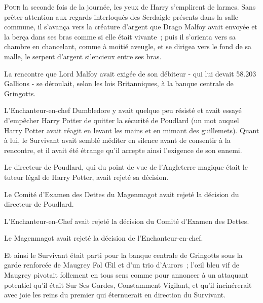 
\lettrine{P}{our} la seconde fois de la journée, les yeux de Harry s'emplirent de larmes. Sans prêter attention aux regards interloqués des Serdaigle présents dans la salle commune, il s'avança vers la créature d'argent que Drago Malfoy avait envoyée et la berça dans ses bras comme si elle était vivante~; puis il s'orienta vers sa chambre en chancelant, comme à moitié aveugle, et se dirigea vers le fond de sa malle, le serpent d'argent silencieux entre ses bras.


La rencontre que Lord Malfoy avait exigée de son débiteur - qui lui devait 58.203 Gallions - se déroulait, selon les lois Britanniques, à la banque centrale de Gringotts.

L'Enchanteur-en-chef Dumbledore y avait quelque peu résisté et avait essayé d'empêcher Harry Potter de quitter la sécurité de Poudlard (un mot auquel Harry Potter avait réagit en levant les mains et en mimant des guillemets). Quant à lui, le Survivant avait semblé méditer en silence avant de consentir à la rencontre, et il avait été étrange qu'il accepte ainsi l'exigence de son ennemi.

Le directeur de Poudlard, qui du point de vue de l'Angleterre magique était le tuteur légal de Harry Potter, avait rejeté sa décision.

Le Comité d'Examen des Dettes du Magenmagot avait rejeté la décision du directeur de Poudlard.

L'Enchanteur-en-Chef avait rejeté la décision du Comité d'Examen des Dettes.

Le Magenmagot avait rejeté la décision de l'Enchanteur-en-chef.

Et ainsi le Survivant était parti pour la banque centrale de Gringotts sous la garde renforcée de Maugrey Fol Œil et d'un trio d'Aurors~; l'œil bleu vif de Maugrey pivotait follement en tous sens comme pour annoncer à un attaquant potentiel qu'il était Sur Ses Gardes, Constamment Vigilant, et qu'il incinérerait avec joie les reins du premier qui éternuerait en direction du Survivant.

